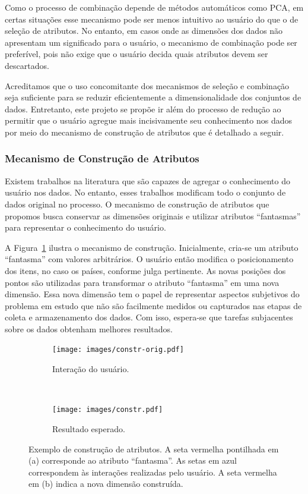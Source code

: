 Como o processo de combinação depende de métodos automáticos
como PCA, em certas situações esse mecanismo pode ser menos
intuitivo ao usuário do que o de seleção de atributos. No
entanto, em casos onde as dimensões dos dados não apresentam
um significado para o usuário, o mecanismo de
combinação pode ser preferível, pois não exige que o usuário
decida quais atributos devem ser descartados.

Acreditamos que o uso concomitante dos mecanismos de seleção
e combinação seja suficiente para se reduzir
eficientemente a dimensionalidade dos conjuntos de dados.
Entretanto, este projeto se propõe ir além do processo de
redução ao permitir que o usuário agregue mais incisivamente
seu conhecimento nos dados por meio do mecanismo de
construção de atributos que é detalhado a seguir.

\subsubsection{Mecanismo de Construção de Atributos}

Existem trabalhos na literatura que são capazes de agregar o
conhecimento do usuário nos dados. No entanto, esses
trabalhos modificam todo o conjunto de dados original no
processo. O mecanismo de construção de atributos que
propomos busca conservar as dimensões originais e utilizar
atributos ``fantasmas'' para representar o conhecimento do
usuário.

A Figura~\ref{fig:constr} ilustra o mecanismo de construção.
Inicialmente, cria-se um atributo ``fantasma'' com valores
arbitrários. O usuário então modifica o posicionamento dos
itens, no caso os países, conforme julga pertinente. As
novas posições dos pontos são utilizadas para transformar o
atributo ``fantasma'' em uma nova dimensão. Essa nova
dimensão tem o papel de representar aspectos subjetivos do
problema em estudo que não são facilmente medidos ou
capturados nas etapas de coleta e armazenamento dos dados.
Com isso, espera-se que tarefas subjacentes sobre os dados
obtenham melhores resultados. 

\begin{figure}[h!]
  \centering
  \begin{subfigure}[b]{0.45\textwidth}
    \centering
    \texttt{[image: images/constr-orig.pdf]}
    \caption{Interação do usuário.}
  \end{subfigure}%
  ~
  \begin{subfigure}[b]{0.45\textwidth}
    \centering
    \texttt{[image: images/constr.pdf]}
    \caption{Resultado esperado.}
  \end{subfigure}
  \caption[Exemplo de construção de atributos.]
  {Exemplo de construção de atributos. A seta vermelha
      pontilhada em (a) corresponde ao atributo
      ``fantasma''. As setas em azul correspondem às
      interações realizadas pelo usuário. A seta vermelha em
      (b) indica a nova dimensão construída.}
  \label{fig:constr}
\end{figure}

